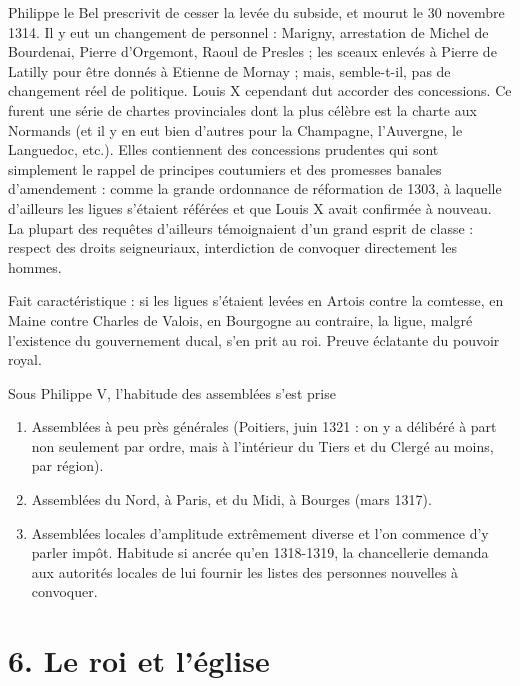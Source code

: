 \documentclass[french,twoside]{book} %
\newcommand{\labelchar}[1]{{\color{rubric}\bf #1}}
\newcommand\chapteropen{} %
\newcommand\chapterclose{} %
\renewcommand\chapteropen{} %
\renewcommand\chapterclose{} %
\begin{document}
\label{p47} Philippe le Bel prescrivit de cesser la levée du subside, et mourut le 30 novembre 1314. Il y eut un changement de personnel : Marigny, arrestation de Michel de Bourdenai, Pierre d’Orgemont, Raoul de Presles ; les sceaux enlevés à Pierre de Latilly pour être donnés à Etienne de Mornay ; mais, semble-t-il, pas de changement réel de politique. Louis X cependant dut accorder des concessions. Ce furent une série de chartes provinciales dont la plus célèbre est la charte aux Normands (et il y en eut bien d’autres pour la Champagne, l’Auvergne, le Languedoc, etc.). Elles contiennent des concessions prudentes qui sont simplement le rappel de principes coutumiers et des promesses banales d’amendement : comme la grande ordonnance de réformation de 1303, à laquelle d’ailleurs les ligues s’étaient référées et que Louis X avait confirmée à nouveau. La plupart des requêtes d’ailleurs témoignaient d’un grand esprit de classe : respect des droits seigneuriaux, interdiction de convoquer directement les hommes.\par
Fait caractéristique : si les ligues s’étaient levées en Artois contre la comtesse, en Maine contre Charles de Valois, en Bourgogne au contraire, la ligue, malgré l’existence du gouvernement ducal, s’en prit au roi. Preuve éclatante du pouvoir royal.\par
\bigbreak
\noindent \labelchar{5)} Sous Philippe V, l’habitude des assemblées s’est prise\par

\begin{enumerate}[itemsep=0pt,]
\item Assemblées à peu près générales (Poitiers, juin 1321 : on y a délibéré à part non seulement par ordre, mais à l’intérieur du Tiers et du Clergé au moins, par région).
\item Assemblées du Nord, à Paris, et du Midi, à Bourges (mars 1317).
\item Assemblées locales d’amplitude extrêmement diverse et l’on commence d’y parler impôt. Habitude si ancrée qu’en 1318-1319, la chancellerie demanda aux autorités locales de lui fournir les listes des personnes nouvelles à convoquer.

\end{enumerate}\chapterclose


\chapteropen
\chapter[6. Le roi et l’église]{\textsc{6. }Le roi et l’église}
\label{c06}
\end{document}
